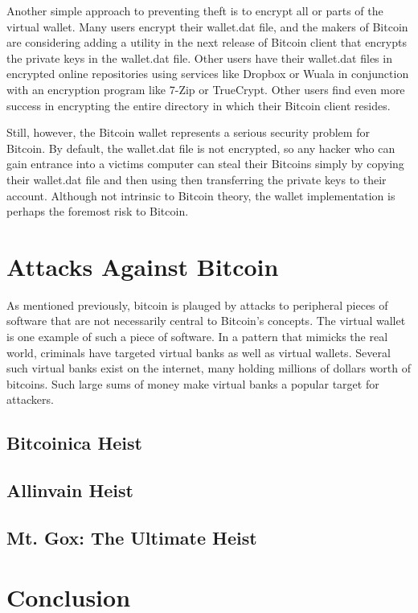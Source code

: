 \documentclass{report}
\begin{document}
Another simple approach to preventing theft is to encrypt all or parts of the virtual 
wallet.  Many users encrypt their wallet.dat file, and the makers of Bitcoin are considering 
adding a utility in the next release of Bitcoin client that encrypts the private keys 
in the wallet.dat file.  Other users have their wallet.dat files in encrypted online 
repositories using services like Dropbox or Wuala in conjunction with an encryption 
program like 7-Zip or TrueCrypt.  Other users find even more success in encrypting the 
entire directory in which their Bitcoin client resides.

Still, however, the Bitcoin wallet represents a serious security problem for Bitcoin.  
By default, the wallet.dat file is not encrypted, so any hacker who can gain entrance 
into a victims computer can steal their Bitcoins simply by copying their wallet.dat file 
and then using then transferring the private keys to their account.  Although not intrinsic 
to Bitcoin theory, the wallet implementation is perhaps the foremost risk to Bitcoin.

\section*{Attacks Against Bitcoin}
As mentioned previously, bitcoin is plauged by attacks to peripheral pieces of software 
that are not necessarily central to Bitcoin's concepts.  The virtual wallet is one example
of such a piece of software.  In a pattern that mimicks the real world, criminals have
targeted virtual banks as well as virtual wallets.  Several such virtual banks exist on
the internet, many holding millions of dollars worth of bitcoins.  Such large sums of 
money make virtual banks a popular target for attackers.

\subsection*{Bitcoinica Heist}

\subsection*{Allinvain Heist}
\subsection*{Mt. Gox: The Ultimate Heist}

\section*{Conclusion}

{}

\end{document}
